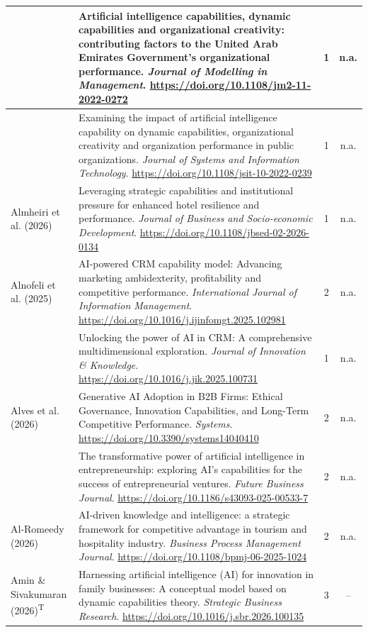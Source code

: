{\begin{longtable}{|>{\raggedright\arraybackslash}p{2.6cm}|>{\raggedright\arraybackslash}p{10.2cm}|c|c|}
\textcite{almheiri2024} & Artificial intelligence capabilities, dynamic capabilities and organizational creativity: contributing factors to the United Arab Emirates Government’s organizational performance. \textit{Journal of Modelling in Management}. \url{https://doi.org/10.1108/jm2-11-2022-0272} & 1 & n.a. \\ \hline
\textcite{almheiri2025} & Examining the impact of artificial intelligence capability on dynamic capabilities, organizational creativity and organization performance in public organizations. \textit{Journal of Systems and Information Technology}. \url{https://doi.org/10.1108/jsit-10-2022-0239} & 1 & n.a. \\ \hline
Almheiri et al. (2026) & Leveraging strategic capabilities and institutional pressure for enhanced hotel resilience and performance. \textit{Journal of Business and Socio-economic Development}. \url{https://doi.org/10.1108/jbsed-02-2026-0134} & 1 & n.a. \\ \hline
Alnofeli et al. (2025) & AI-powered CRM capability model: Advancing marketing ambidexterity, profitability and competitive performance. \textit{International Journal of Information Management}. \url{https://doi.org/10.1016/j.ijinfomgt.2025.102981} & 2 & n.a. \\ \hline
\textcite{alnofeli2025} & Unlocking the power of AI in CRM: A comprehensive multidimensional exploration. \textit{Journal of Innovation \& Knowledge}. \url{https://doi.org/10.1016/j.jik.2025.100731} & 1 & n.a. \\ \hline
Alves et al. (2026) & Generative AI Adoption in B2B Firms: Ethical Governance, Innovation Capabilities, and Long-Term Competitive Performance. \textit{Systems}. \url{https://doi.org/10.3390/systems14040410} & 2 & n.a. \\ \hline
\textcite{almamary2025} & The transformative power of artificial intelligence in entrepreneurship: exploring AI’s capabilities for the success of entrepreneurial ventures. \textit{Future Business Journal}. \url{https://doi.org/10.1186/s43093-025-00533-7} & 2 & n.a. \\ \hline
Al-Romeedy (2026) & AI-driven knowledge and intelligence: a strategic framework for competitive advantage in tourism and hospitality industry. \textit{Business Process Management Journal}. \url{https://doi.org/10.1108/bpmj-06-2025-1024} & 2 & n.a. \\ \hline
Amin \& Sivakumaran (2026)\textsuperscript{T} & Harnessing artificial intelligence (AI) for innovation in family businesses: A conceptual model based on dynamic capabilities theory. \textit{Strategic Business Research}. \url{https://doi.org/10.1016/j.sbr.2026.100135} & 3 & -- \\ \hline

\end{longtable}}
